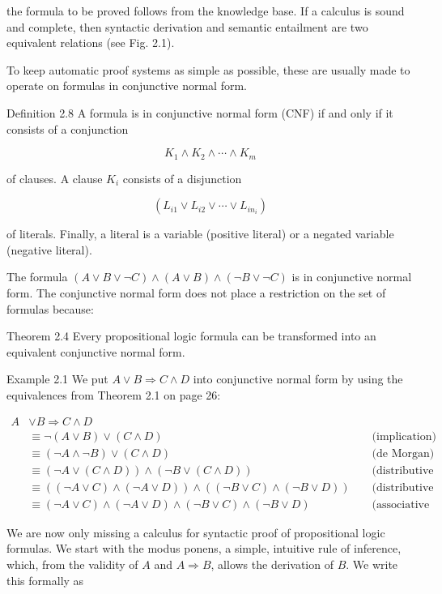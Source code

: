 \documentclass[10pt]{book}
\begin{document}
the formula to be proved follows from the knowledge base. If a calculus is sound and complete, then syntactic derivation and semantic entailment are two equivalent relations (see Fig. 2.1).

To keep automatic proof systems as simple as possible, these are usually made to operate on formulas in conjunctive normal form.

Definition 2.8 A formula is in conjunctive normal form (CNF) if and only if it consists of a conjunction

$$
K_{1} \wedge K_{2} \wedge \cdots \wedge K_{m}
$$

of clauses. A clause $K_{i}$ consists of a disjunction

$$
\left(L_{i 1} \vee L_{i 2} \vee \cdots \vee L_{i n_{i}}\right)
$$

of literals. Finally, a literal is a variable (positive literal) or a negated variable (negative literal).

The formula $(A \vee B \vee \neg C) \wedge(A \vee B) \wedge(\neg B \vee \neg C)$ is in conjunctive normal form. The conjunctive normal form does not place a restriction on the set of formulas because:

Theorem 2.4 Every propositional logic formula can be transformed into an equivalent conjunctive normal form.

Example 2.1 We put $A \vee B \Rightarrow C \wedge D$ into conjunctive normal form by using the equivalences from Theorem 2.1 on page 26:

$$
\begin{aligned}
A & \vee B \Rightarrow C \wedge D & & \\
& \equiv \neg(A \vee B) \vee(C \wedge D) & & \text { (implication) } \\
& \equiv(\neg A \wedge \neg B) \vee(C \wedge D) & & \text { (de Morgan) } \\
& \equiv(\neg A \vee(C \wedge D)) \wedge(\neg B \vee(C \wedge D)) & & \text { (distributive law) } \\
& \equiv((\neg A \vee C) \wedge(\neg A \vee D)) \wedge((\neg B \vee C) \wedge(\neg B \vee D)) & & \text { (distributive law) } \\
& \equiv(\neg A \vee C) \wedge(\neg A \vee D) \wedge(\neg B \vee C) \wedge(\neg B \vee D) & & \text { (associative law) }
\end{aligned}
$$

We are now only missing a calculus for syntactic proof of propositional logic formulas. We start with the modus ponens, a simple, intuitive rule of inference, which, from the validity of $A$ and $A \Rightarrow B$, allows the derivation of $B$. We write this formally as
\end{document}
